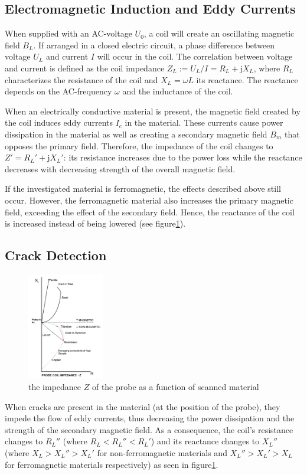 \subsection{Electromagnetic Induction and Eddy Currents}
When supplied with an AC-voltage $U_0$, a coil will create an oscillating magnetic field $B_L$. If arranged in a closed electric circuit, a phase difference between voltage $U_L$ and current $I$ will occur in the coil. The correlation between voltage and current is defined as the coil impedance $Z_L:=U_L/I=R_L+\text{j}X_L$, where $R_L$ characterizes the resistance of the coil and $X_L = \omega L$ its reactance. The reactance depends on the AC-frequency $\omega$ and the inductance of the coil. 
\par
When an electrically conductive material is present, the magnetic field created by the coil induces eddy currents $I_c$ in the material. These currents cause power dissipation in the material as well as creating a secondary magnetic field $B_m$ that opposes the primary field. Therefore, the impedance of the coil changes to $Z'=R_L'+\text{j}X_L'$: its resistance increases due to the power loss while the reactance decreases with decreasing strength of the overall magnetic field.
\par
If the investigated material is ferromagnetic, the effects described above still occur. However, the ferromagnetic material also increases the primary magnetic field, exceeding the effect of the secondary field\cite{eddyCurrent}. Hence, the reactance of the coil is increased instead of being lowered (see figure\ref{fig:CoilImpedance}).

\subsection{Crack Detection}
\begin{figure}[htbp]
	\centering
		\includegraphics[width=0.3\textwidth]{img/CoilImpedance}
	\caption{the impedance $Z$ of the probe as a function of scanned material\cite{coilImpedance}}
	\label{fig:CoilImpedance}
\end{figure}
When cracks are present in the material (at the position of the probe), they impede the flow of eddy currents, thus decreasing the power dissipation and the strength of the secondary magnetic field. As a consequence, the coil's resistance changes to $R_L''$ (where $R_L<R_L''<R_L'$) and its reactance changes to $X_L''$ (where $X_L>X_L''>X_L'$ for non-ferromagnetic materials and $X_L''>X_L'>X_L$ for ferromagnetic materials respectively) as seen in figure\ref{fig:CoilImpedance}.

